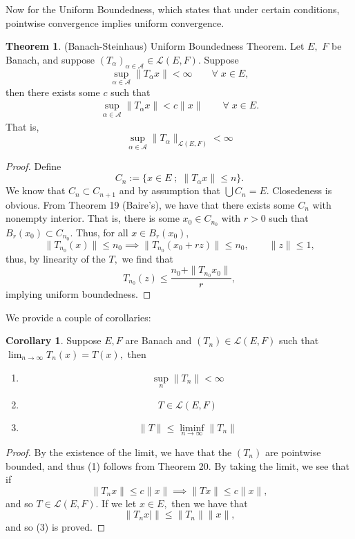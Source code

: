\documentclass[10pt, oneside]{article}
\theoremstyle{definition}
\newtheorem{thm}{Theorem}
\newtheorem{cor}{Corollary}
\begin{document}
Now for the Uniform Boundedness, which states that under certain conditions, pointwise convergence implies uniform convergence.
\begin{thm}
    (Banach-Steinhaus) Uniform Boundedness Theorem. Let $E,$ $F$ be Banach, and suppose $(T_\alpha)_{\alpha \in \mathcal{A}} \in \mathcal{L}(E, F).$ Suppose 
    \[\sup_{\alpha \in \mathcal{A}}\|T_\alpha x\| < \infty \qquad \forall  \; x\in E,\] then there exists some $c$ such that 
    \begin{align}
        \sup_{\alpha\in \mathcal{A}}\|T_\alpha x \| < c\|x\| \qquad \forall \; x\in E.
    \end{align}
    That is, 
    \[\sup_{\alpha\in \mathcal{A}}\|T_\alpha\|_{\mathcal{L}(E, F)} <\infty\]
\end{thm}
\begin{proof}
    Define
    \[C_n := \{x \in E \; ; \; \|T_\alpha x\| \leq n\}.\] We know that $C_n \subset C_{n+1}$ and by assumption that $\bigcup C_n = E.$ Closedeness is obvious. From Theorem 19 (Baire's), we have that there exists some $C_n$ with nonempty interior. That is, there is some $x_0\in C_{n_0}$ with $r>0$ such that $B_r(x_0)\subset C_{n_0}.$ Thus, for all $x\in B_r(x_0),$
    \[\|T_{n_0}(x)\| \leq n_0 \implies \|T_{n_0}(x_0 + rz)\| \leq n_0, \qquad \|z\| \leq 1,\] thus, by linearity of the $T,$ we find that 
    \[T_{n_0}(z) \leq \frac{n_0 + \|T_{n_0}x_0\|}{r},\] implying uniform boundedness.
\end{proof}

We provide a couple of corollaries:
\begin{cor}
    Suppose $E, F$ are Banach and $(T_n)\in \mathcal{L}(E, F)$ such that $\lim_{n\to \infty} T_n(x) = T(x),$ then 
    \begin{enumerate}
    \item \[\sup_{n} \|T_n\| < \infty\]
        \item \[T\in \mathcal{L}(E, F)\]
        \item \[\|T\| \leq \liminf_{n\to \infty}\|T_n\|\]
    \end{enumerate}
\end{cor}
\begin{proof}
    By the existence of the limit, we have that the $(T_n)$ are pointwise bounded, and thus (1) follows from Theorem 20. By taking the limit, we see that if 
    \[\|T_nx\| \leq c\|x\| \implies \|Tx\| \leq c\|x\|,\] and so $T\in \mathcal{L}(E,F).$ If we let $x\in E,$ then we have that 
    \[\|T_nx|\|\leq \|T_n\|\|x\|,\] and so (3) is proved.
\end{proof}
\end{document}
